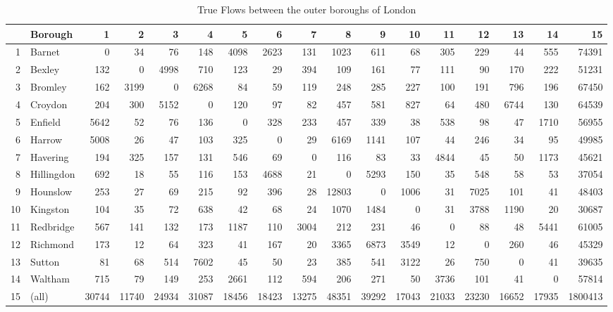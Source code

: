 \documentclass[11pt]{article} %
\begin{document}





\begin{table}
\footnotesize
\caption{True Flows between the outer boroughs of London}
\begin{tabular}{|r|l|r|r|r|r|r|r|r|r|r|r|r|r|r|r|r|}
\hline
\multicolumn{1}{|l|}{} & Borough & 1 & 2 & 3 & 4 & 5 & 6 & 7 & 8 & 9 & 10 & 11 & 12 & 13 & 14 & 15 \\ \hline
1 & Barnet & 0 & 34 & 76 & 148 & 4098 & 2623 & 131 & 1023 & 611 & 68 & 305 & 229 & 44 & 555 & 74391 \\ \hline
2 & Bexley & 132 & 0 & 4998 & 710 & 123 & 29 & 394 & 109 & 161 & 77 & 111 & 90 & 170 & 222 & 51231 \\ \hline
3 & Bromley & 162 & 3199 & 0 & 6268 & 84 & 59 & 119 & 248 & 285 & 227 & 100 & 191 & 796 & 196 & 67450 \\ \hline
4 & Croydon & 204 & 300 & 5152 & 0 & 120 & 97 & 82 & 457 & 581 & 827 & 64 & 480 & 6744 & 130 & 64539 \\ \hline
5 & Enfield & 5642 & 52 & 76 & 136 & 0 & 328 & 233 & 457 & 339 & 38 & 538 & 98 & 47 & 1710 & 56955 \\ \hline
6 & Harrow & 5008 & 26 & 47 & 103 & 325 & 0 & 29 & 6169 & 1141 & 107 & 44 & 246 & 34 & 95 & 49985 \\ \hline
7 & Havering & 194 & 325 & 157 & 131 & 546 & 69 & 0 & 116 & 83 & 33 & 4844 & 45 & 50 & 1173 & 45621 \\ \hline
8 & Hillingdon & 692 & 18 & 55 & 116 & 153 & 4688 & 21 & 0 & 5293 & 150 & 35 & 548 & 58 & 53 & 37054 \\ \hline
9 & Hounslow & 253 & 27 & 69 & 215 & 92 & 396 & 28 & 12803 & 0 & 1006 & 31 & 7025 & 101 & 41 & 48403 \\ \hline
10 & Kingston & 104 & 35 & 72 & 638 & 42 & 68 & 24 & 1070 & 1484 & 0 & 31 & 3788 & 1190 & 20 & 30687 \\ \hline
11 & Redbridge & 567 & 141 & 132 & 173 & 1187 & 110 & 3004 & 212 & 231 & 46 & 0 & 88 & 48 & 5441 & 61005 \\ \hline
12 & Richmond & 173 & 12 & 64 & 323 & 41 & 167 & 20 & 3365 & 6873 & 3549 & 12 & 0 & 260 & 46 & 45329 \\ \hline
13 & Sutton & 81 & 68 & 514 & 7602 & 45 & 50 & 23 & 385 & 541 & 3122 & 26 & 750 & 0 & 41 & 39635 \\ \hline
14 & Waltham & 715 & 79 & 149 & 253 & 2661 & 112 & 594 & 206 & 271 & 50 & 3736 & 101 & 41 & 0 & 57814 \\ \hline
15 & (all) & 30744 & 11740 & 24934 & 31087 & 18456 & 18423 & 13275 & 48351 & 39292 & 17043 & 21033 & 23230 & 16652 & 17935 & 1800413 \\ \hline
\end{tabular}
\label{Actual Flows Outer}
\end{table}
\end{document}
